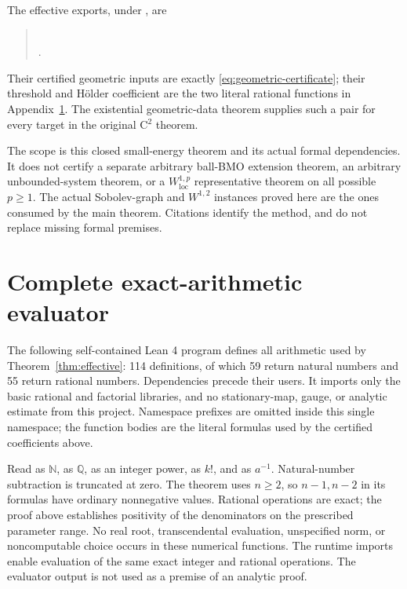 \documentclass[reqno,11pt]{amsart}
\numberwithin{equation}{section}
\theoremstyle{definition}
\theoremstyle{remark}
\newcommand{\loc}{\mathrm{loc}}
\begin{document}
The effective exports, under , are
\begin{quote}
\\
.
\end{quote} Their certified geometric inputs are
exactly \eqref{eq:geometric-certificate}; their threshold and H\"older
coefficient are the two literal rational functions in
Appendix~\ref{app:algorithm}. The existential geometric-data theorem
supplies such a pair for every target in the original C$^2$ theorem.

The scope is this closed small-energy theorem and its actual formal
dependencies. It does not certify a separate arbitrary ball-BMO
extension theorem, an arbitrary unbounded-system theorem, or a
$W^{1,p}_{\loc}$ representative theorem on all possible $p\geq1$.
The actual Sobolev-graph and $W^{1,2}$ instances proved here are the
ones consumed by the main theorem. Citations identify the method,
and do not replace missing formal premises.

\appendix
\section{Complete exact-arithmetic evaluator}\label{app:algorithm}
The following self-contained Lean 4 program defines all arithmetic used by
Theorem~\ref{thm:effective}: 114 definitions, of which 59 return natural
numbers and 55 return rational numbers. Dependencies precede their users.
It imports only the basic rational and factorial libraries, and no
stationary-map, gauge, or analytic estimate from this project. Namespace
prefixes are omitted inside this single namespace; the function bodies are
the literal formulas used by the certified coefficients above.

Read  as $\mathbb N$,  as $\mathbb Q$,
 as an integer power,  as $k!$,
and  as $a^{-1}$. Natural-number subtraction is truncated
at zero. The theorem uses $n\geq2$, so $n-1,n-2$ in its formulas have
ordinary nonnegative values. Rational operations are exact; the proof above
establishes positivity of the denominators on the prescribed parameter
range. No real root, transcendental evaluation, unspecified norm,
or noncomputable choice occurs in these numerical functions.
The runtime imports enable evaluation of the same exact integer and rational
operations. The evaluator output is not used as a premise of an analytic
proof.
\end{document}
